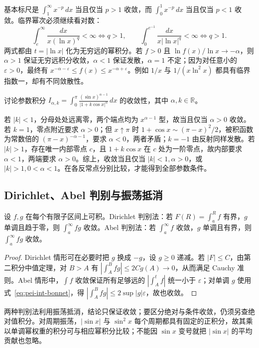 基本标尺是 $\int_1^\infty x^{-p}\,dx$ 当且仅当 $p>1$ 收敛，而 $\int_0^1x^{-p}\,dx$ 当且仅当 $p<1$ 收敛。临界幂次必须继续看对数：
\[
 \int_e^\infty\frac{dx}{x(\ln x)^q}<\infty\iff q>1,
 \qquad
 \int_0^{e^{-1}}\frac{dx}{x|\ln x|^q}<\infty\iff q>1.
\]
两式都由 $t=|\ln x|$ 化为无穷远的幂积分。若 $f>0$ 且 $\ln f(x)/\ln x\to-\alpha$，则 $\alpha>1$ 保证无穷远积分收敛，$\alpha<1$ 保证发散，$\alpha=1$ 不定；因为对任意小的 $\varepsilon>0$，最终有 $x^{-\alpha-\varepsilon}\le f(x)\le x^{-\alpha+\varepsilon}$。例如 $1/x$ 与 $1/(x\ln^2x)$ 都具有临界指数一，却有不同敛散性。

\begin{example}
讨论参数积分 $\displaystyle I_{\alpha,k}=\int_0^\pi\frac{(\sin x)^{\alpha-1}}{|1+k\cos x|^\alpha}\,dx$ 的收敛性，其中 $\alpha,k\in\mathbb R$。
\end{example}
\begin{solve}
若 $|k|<1$，分母处处远离零，两个端点均为 $x^{\alpha-1}$ 型，故当且仅当 $\alpha>0$ 收敛。若 $k=1$，零点附近要求 $\alpha>0$；但 $x\uparrow\pi$ 时 $1+\cos x\sim(\pi-x)^2/2$，被积函数为常数倍的 $(\pi-x)^{-\alpha-1}$，要求 $\alpha<0$，两者矛盾；$k=-1$ 由反射同样发散。若 $|k|>1$，存在唯一内部零点 $c$，且 $1+k\cos x$ 在 $c$ 处为一阶零点，故内部要求 $\alpha<1$，两端要求 $\alpha>0$。综上，收敛当且仅当 $|k|<1,\alpha>0$，或 $|k|>1,0<\alpha<1$。在各反常点分别比较，才能得到全部参数条件。
\end{solve}

\subsection{Dirichlet、Abel 判别与振荡抵消}
\begin{theorem}
\label{thm:pei-int-dirichlet-abel}
设 $f,g$ 在每个有限子区间上可积。Dirichlet 判别法：若 $F(R)=\int_a^Rf$ 有界，$g$ 单调且趋于零，则 $\int_a^\infty fg$ 收敛。Abel 判别法：若 $\int_a^\infty f$ 收敛，$g$ 单调且有界，则 $\int_a^\infty fg$ 收敛。
\end{theorem}
\begin{proof}
Dirichlet 情形可在必要时把 $g$ 换成 $-g$，设 $g\ge0$ 递减。若 $|F|\le C$，由第二积分中值定理，对 $B>A$ 有 $|\int_A^Bfg|\le2Cg(A)\to0$，从而满足 Cauchy 准则。Abel 情形中，$\int f$ 收敛保证所有足够远的 $|\int_A^tf|$ 统一小于 $\varepsilon$；对单调 $g$ 使用式~\eqref{eq:pei-int-bonnet}，得 $|\int_A^Bfg|\le2\sup|g|\varepsilon$，故也收敛。
\end{proof}
两种判别法利用振荡抵消，结论只保证收敛；要区分绝对与条件收敛，仍须另查绝对值积分。对周期振荡，$|\sin x|$ 与 $\sin^2x$ 每个周期都具有固定的正积分，故其乘以单调幂权重的积分可与相应幂积分比较；不能因 $\sin x$ 变号就把 $|\sin x|$ 的平均贡献也忽略。

